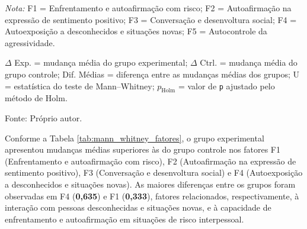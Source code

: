       \begin{table}[htbp]
      \centering
      \caption{Comparação dos fatores do IHS entre os grupos experimental e controle.}
      \label{tab:mann_whitney_fatores}

      \vspace{2mm}
      \begin{minipage}{\textwidth}
      \footnotesize
      \textit{Nota:}
      F1 = Enfrentamento e autoafirmação com risco;
      F2 = Autoafirmação na expressão de sentimento positivo;
      F3 = Conversação e desenvoltura social;
      F4 = Autoexposição a desconhecidos e situações novas;
      F5 = Autocontrole da agressividade.

      $\Delta$ Exp. = mudança média do grupo experimental;
      $\Delta$ Ctrl. = mudança média do grupo controle;
      Dif. Médias = diferença entre as mudanças médias
      dos grupos;
      U = estatística do teste de Mann--Whitney;
      $p_{\text{Holm}}$ = valor de \texttt{p} ajustado
      pelo método de Holm.
      \end{minipage}
      \par
      \vspace{2mm}
      \footnotesize Fonte: Próprio autor.
      \end{table}


      Conforme a Tabela \ref{tab:mann_whitney_fatores}, o grupo experimental apresentou mudanças médias superiores às do grupo controle nos fatores F1 (Enfrentamento e autoafirmação com risco), F2 (Autoafirmação na expressão de sentimento positivo), F3 (Conversação e desenvoltura social) e F4 (Autoexposição a desconhecidos e situações novas). As maiores diferenças entre os grupos foram observadas em F4 (\textbf{0,635}) e F1 (\textbf{0,333}), fatores relacionados, respectivamente, à interação com pessoas desconhecidas e situações novas, e à capacidade de enfrentamento e autoafirmação em situações de risco interpessoal.

